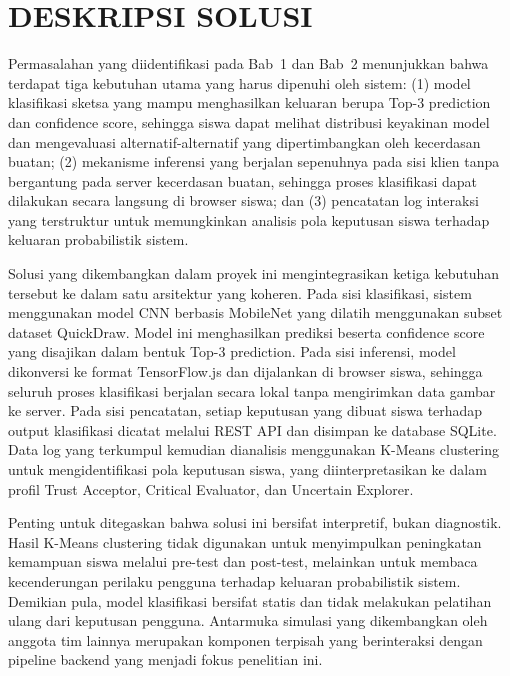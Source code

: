 \documentclass[12pt,oneside]{report}
\begin{document}
\section{DESKRIPSI SOLUSI}
\label{sec:deskripsi-solusi}

Permasalahan yang diidentifikasi pada Bab~1 dan Bab~2 menunjukkan bahwa terdapat tiga kebutuhan utama yang harus dipenuhi oleh sistem: (1) model klasifikasi sketsa yang mampu menghasilkan keluaran berupa Top-3 prediction dan confidence score, sehingga siswa dapat melihat distribusi keyakinan model dan mengevaluasi alternatif-alternatif yang dipertimbangkan oleh kecerdasan buatan; (2) mekanisme inferensi yang berjalan sepenuhnya pada sisi klien tanpa bergantung pada server kecerdasan buatan, sehingga proses klasifikasi dapat dilakukan secara langsung di browser siswa; dan (3) pencatatan log interaksi yang terstruktur untuk memungkinkan analisis pola keputusan siswa terhadap keluaran probabilistik sistem.

Solusi yang dikembangkan dalam proyek ini mengintegrasikan ketiga kebutuhan tersebut ke dalam satu arsitektur yang koheren. Pada sisi klasifikasi, sistem menggunakan model CNN berbasis MobileNet yang dilatih menggunakan subset dataset QuickDraw. Model ini menghasilkan prediksi beserta confidence score yang disajikan dalam bentuk Top-3 prediction. Pada sisi inferensi, model dikonversi ke format TensorFlow.js dan dijalankan di browser siswa, sehingga seluruh proses klasifikasi berjalan secara lokal tanpa mengirimkan data gambar ke server. Pada sisi pencatatan, setiap keputusan yang dibuat siswa terhadap output klasifikasi dicatat melalui REST API dan disimpan ke database SQLite. Data log yang terkumpul kemudian dianalisis menggunakan K-Means clustering untuk mengidentifikasi pola keputusan siswa, yang diinterpretasikan ke dalam profil Trust Acceptor, Critical Evaluator, dan Uncertain Explorer.

Penting untuk ditegaskan bahwa solusi ini bersifat interpretif, bukan diagnostik. Hasil K-Means clustering tidak digunakan untuk menyimpulkan peningkatan kemampuan siswa melalui pre-test dan post-test, melainkan untuk membaca kecenderungan perilaku pengguna terhadap keluaran probabilistik sistem. Demikian pula, model klasifikasi bersifat statis dan tidak melakukan pelatihan ulang dari keputusan pengguna. Antarmuka simulasi yang dikembangkan oleh anggota tim lainnya merupakan komponen terpisah yang berinteraksi dengan pipeline backend yang menjadi fokus penelitian ini.
\end{document}
